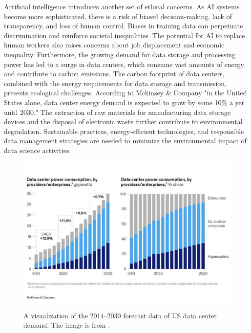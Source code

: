 \documentclass{vgtc}                          %
\begin{document}
Artificial intelligence introduces another set of ethical concerns. As AI systems become more sophisticated, there is a risk of biased decision-making, lack of transparency, and loss of human control. Biases 
in training data can perpetuate discrimination and reinforce societal inequalities. The potential for AI to replace human workers also raises concerns about job displacement and economic inequality. Furthermore, 
the growing demand for data storage and processing power has led to a surge in data centers, which consume vast amounts of energy and contribute to carbon emissions. The carbon footprint 
of data centers, combined with the energy requirements for data storage and transmission, presents ecological challenges. According to Mckinsey \& Company "in the United States alone, data center energy demand is 
expected to grow by some 10\% a yer until 2030."\cite{Bangalore:2023} The extraction of raw materials for manufacturing data storage devices and the disposal of electronic waste further contribute to environmental 
degradation. Sustainable practices, energy-efficient technologies, and responsible data management strategies are needed to minimize the environmental impact of data science activities.

\begin{figure}[h]
  \centering %
  \includegraphics[width=\columnwidth]{datacenter_demand}
  \caption{A visualization of the 2014--2030 forecast data of US data center demand. The image is from \cite{Bangalore:2023}.}
  \label{fig:sample}
\end{figure}
\end{document}
